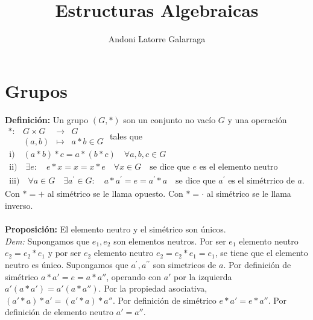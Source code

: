 \documentclass{article}
\title{Estructuras Algebraicas}
\author{Andoni Latorre Galarraga}
\date{}
\begin{document}
\maketitle

\section{Grupos}
\setlength{\parindent}{0cm}


\textbf{Definición:} Un grupo $(G,*)$ son un conjunto no vacío $G$ y una operación $\begin{array}{lllll}
    *: & G\times G & \longrightarrow & G  \\
       & (a,b)     & \longmapsto     & a*b\in G 
\end{array}$ tales que\\
$$
\begin{array}{l}
    \text{i)} \quad (a*b)*c=a*(b*c) \quad \forall a,b,c\in G \\
    \text{ii)} \quad \exists e : \quad e*x=x=x*e \quad \forall x \in G\quad\text{se dice que }e\text{ es el elemento neutro}\\
    \text{iii)} \quad \forall a\in G \quad \exists a^\prime \in G:\quad a*a^\prime=e=a^\prime*a \quad \text{se dice que }a^\prime\text{ es el simétrrico de }a\text{.}
\end{array}
$$
Con $*=+$ al simétrico se le llama opuesto. Con $*=\cdot$ al simétrico se le llama inverso.\\\\


\textbf{Proposición:} El elemento neutro y el simétrico son únicos.\\
\textit{Dem:} Supongamos que $e_1,e_2$ son elementos neutros. Por ser $e_1$ elemento neutro $e_2=e_2*e_1$ y por ser $e_2$ elemento neutro $e_2=e_2*e_1=e_1$, se tiene que el elemento neutro es único. Supongamos que $a^\prime,a^{\prime\prime}$ son simetricos de $a$. Por definición de simétrico $a*a'=e=a*a''$, operando con $a'$ por la izquierda $a'(a*a')=a'(a*a'')$. Por la propiedad asociativa, $(a'*a)*a'=(a'*a)*a''$. Por definición de simétrico $e*a'=e*a''$. Por definición de elemento neutro $a'=a''$.\\\\

\end{document}
